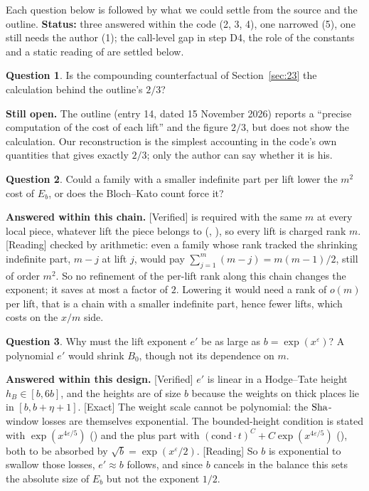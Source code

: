 \documentclass[11pt]{article}
\newcommand{\Exact}{\textcolor{exactc}{\textsf{\small[Exact]}}}
\newcommand{\Verified}{\textcolor{verc}{\textsf{\small[Verified]}}}
\newcommand{\Reading}{\textcolor{readc}{\textsf{\small[Reading]}}}
\newcommand{\eps}{\varepsilon}
\theoremstyle{plain}
\theoremstyle{definition}
\newtheorem{question}{Question}
\begin{document}
Each question below is followed by what we could settle from the source and the outline.
\textbf{Status:} three answered within the code (2, 3, 4), one narrowed (5), one still needs the
author (1); the call-level gap in step D4, the role of the constants and a static reading of
 are settled below.

\begin{question}
Is the compounding counterfactual of Section~\ref{sec:23} the calculation behind the outline's
$2/3$?
\end{question}
\noindent\textbf{Still open.} The outline (entry 14, dated 15 November 2026) reports a ``precise
computation of the cost of each lift'' and the figure $2/3$, but does not show the calculation. Our
reconstruction is the simplest accounting in the code's own quantities that gives exactly $2/3$;
only the author can say whether it is his.

\begin{question}
Could a family with a smaller indefinite part per lift lower the $m^2$ cost of $E_b$, or does the
Bloch--Kato count force it?
\end{question}
\noindent\textbf{Answered within this chain.} \Verified{}  is required with
the same $m$ at every local piece, whatever lift the piece belongs to (,
), so every lift is charged rank $m$. \Reading{} checked by
arithmetic: even a family whose rank tracked the shrinking indefinite part, $m-j$ at lift $j$, would
pay $\sum_{j=1}^{m}(m-j)=m(m-1)/2$, still of order $m^2$. So no refinement of the per-lift rank
along this chain changes the exponent; it saves at most a factor of $2$. Lowering it would need a
rank of $o(m)$ per lift, that is a chain with a smaller indefinite part, hence fewer lifts, which
costs on the $x/m$ side.

\begin{question}
Why must the lift exponent $e'$ be as large as $b=\exp(x^\eps)$? A polynomial $e'$ would shrink
$B_0$, though not its dependence on $m$.
\end{question}
\noindent\textbf{Answered within this design.} \Verified{} $e'$ is linear in a Hodge--Tate height
$h_B\in[b,6b]$, and the heights are of size $b$ because the weights on thick places lie in
$[b,b+\eta+1]$. \Exact{} The weight scale cannot be polynomial: the $\mathrm{Sha}$-window losses are
themselves exponential. The bounded-height condition is stated with $\exp(x^{4\eps/5})$
() and the plus part with $(\mathrm{cond}\cdot t)^C+C\exp(x^{4\eps/5})$ (),
both to be absorbed by $\sqrt b=\exp(x^\eps/2)$. \Reading{} So $b$ is exponential to swallow those
losses, $e'\approx b$ follows, and since $b$ cancels in the balance this sets the absolute size of
$E_b$ but not the exponent $1/2$.
\end{document}
